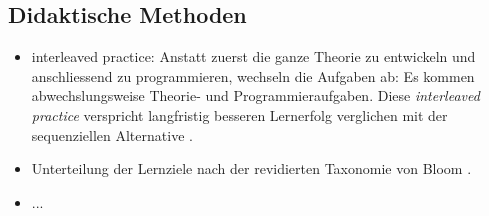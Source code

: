 \subsection{Didaktische Methoden}
\begin{itemize}
	\item interleaved practice: Anstatt zuerst die ganze Theorie zu entwickeln und anschliessend zu programmieren, wechseln die Aufgaben ab: Es kommen abwechslungsweise Theorie- und Programmieraufgaben.
	Diese \textit{interleaved practice} verspricht langfristig besseren Lernerfolg verglichen mit der sequenziellen Alternative \cite{Rohrer14}.
	\item Unterteilung der Lernziele nach der revidierten Taxonomie von Bloom \cite{Anderson2001}.
	\item ...
\end{itemize}